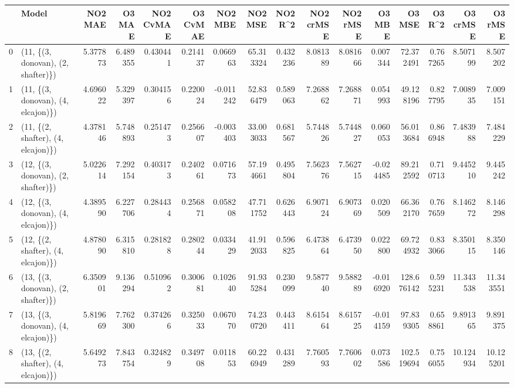 \begin{tabular}{llrrrrrrrrrrrrrr}
\toprule
{} &                               Model &   NO2 MAE &    O3 MAE &  NO2 CvMAE &  O3 CvMAE &   NO2 MBE &    NO2 MSE &   NO2 R\textasciicircum2 &  NO2 crMSE &  NO2 rMSE &    O3 MBE &      O3 MSE &    O3 R\textasciicircum2 &   O3 crMSE &    O3 rMSE \\
\midrule
0  &  (11, \{(3, donovan), (2, shafter)\}) &  5.377873 &  6.489355 &   0.430441 &  0.214137 &  0.066963 &  65.313324 &  0.432236 &   8.081389 &  8.081666 &  0.007344 &   72.372491 &  0.767265 &   8.507199 &   8.507202 \\
1  &  (11, \{(3, donovan), (4, elcajon)\}) &  4.696022 &  5.329397 &   0.304156 &  0.220024 & -0.011242 &  52.836479 &  0.589063 &   7.268862 &  7.268871 &  0.054993 &   49.128196 &  0.827795 &   7.008935 &   7.009151 \\
2  &  (11, \{(2, shafter), (4, elcajon)\}) &  4.378146 &  5.748893 &   0.251473 &  0.256607 & -0.003403 &  33.003033 &  0.681567 &   5.744826 &  5.744827 &  0.060053 &   56.013684 &  0.866948 &   7.483988 &   7.484229 \\
3  &  (12, \{(3, donovan), (2, shafter)\}) &  5.022614 &  7.292154 &   0.403173 &  0.240261 &  0.071673 &  57.194661 &  0.495804 &   7.562376 &  7.562715 & -0.024485 &   89.212592 &  0.710713 &   9.445210 &   9.445242 \\
4  &  (12, \{(3, donovan), (4, elcajon)\}) &  4.389590 &  6.227706 &   0.284434 &  0.256871 &  0.058208 &  47.711752 &  0.626443 &   6.907124 &  6.907369 &  0.020509 &   66.362170 &  0.767659 &   8.146272 &   8.146298 \\
5  &  (12, \{(2, shafter), (4, elcajon)\}) &  4.878090 &  6.315810 &   0.281828 &  0.280244 &  0.033429 &  41.912033 &  0.596825 &   6.473864 &  6.473950 &  0.022800 &   69.724932 &  0.833066 &   8.350115 &   8.350146 \\
6  &  (13, \{(3, donovan), (2, shafter)\}) &  6.350901 &  9.136294 &   0.510962 &  0.300681 &  0.102640 &  91.935284 &  0.230099 &   9.587740 &  9.588289 & -0.016920 &  128.676142 &  0.595231 &  11.343538 &  11.343551 \\
7  &  (13, \{(3, donovan), (4, elcajon)\}) &  5.819669 &  7.762300 &   0.374266 &  0.325033 &  0.067070 &  74.230720 &  0.443411 &   8.615464 &  8.615725 & -0.014159 &   97.839305 &  0.658861 &   9.891365 &   9.891375 \\
8  &  (13, \{(2, shafter), (4, elcajon)\}) &  5.649273 &  7.843754 &   0.324829 &  0.349708 &  0.011853 &  60.226949 &  0.431289 &   7.760593 &  7.760602 &  0.073586 &  102.519694 &  0.756055 &  10.124934 &  10.125201 \\

\end{tabular}

